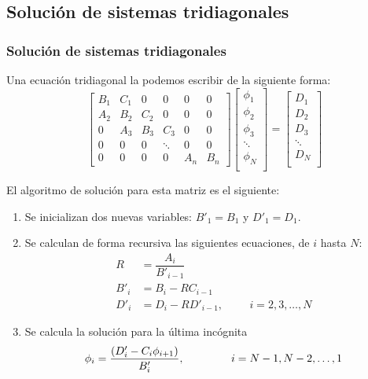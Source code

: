 
\subsection{Soluci\'{o}n de sistemas tridiagonales}
\begin{frame}
\frametitle{Soluci\'{o}n de sistemas tridiagonales}
Una ecuaci\'{o}n tridiagonal la podemos escribir de la siguiente forma:
\[
\begin{bmatrix}
B_{1} & C_{1} & 0 & 0 & 0 & 0 \\
A_{2} & B_{2} & C_{2} & 0 & 0 & 0 \\
0 & A_{3} & B_{3} & C_{3} & 0 & 0 \\
0 & 0 & 0 & \ddots & 0 & 0 \\
0 & 0 & 0 & 0 & A_{n}& B_{n} 
\end{bmatrix}
\begin{bmatrix}
\phi_{1} \\
\phi_{2} \\
\phi_{3} \\
\ddots \\
\phi_{N} \\
\end{bmatrix} =
\begin{bmatrix}
D_{1} \\
D_{2} \\
D_{3} \\
\ddots \\
D_{N} \\
\end{bmatrix}
\]
\end{frame}
\begin{frame}
El algoritmo de soluci\'{o}n para esta matriz es el siguiente:
\begin{enumerate}
\item Se inicializan dos nuevas variables: $B'_{1}=B_{1}$ y $D'_{1}=D_{1}$.
\item Se calculan de forma recursiva las siguientes ecuaciones, de $i$ hasta $N$:
\[ \begin{split} R &= \dfrac{A_{i}}{B'_{i-1}} \\
B'_{i} &= B_{i} -RC_{i-1} \\
D'_{i} &= D_{i} - RD'_{i-1}, \hspace{1cm} i=2,3,\ldots,N
\end{split} \]
\end{enumerate}
\end{frame}
\begin{frame}
\begin{enumerate}
\setcounter{enumi}{2}
\item Se calcula la soluci\'{o}n para la \'{u}ltima inc\'{o}gnita
\[ \phi_{i} = \dfrac{(D'_{i}-C_{i}\phi_{i+1})}{B'_{i}}, \hspace{1.5 cm} i=N-1, N-2,\ldots,1\]
\end{enumerate}
\end{frame}
